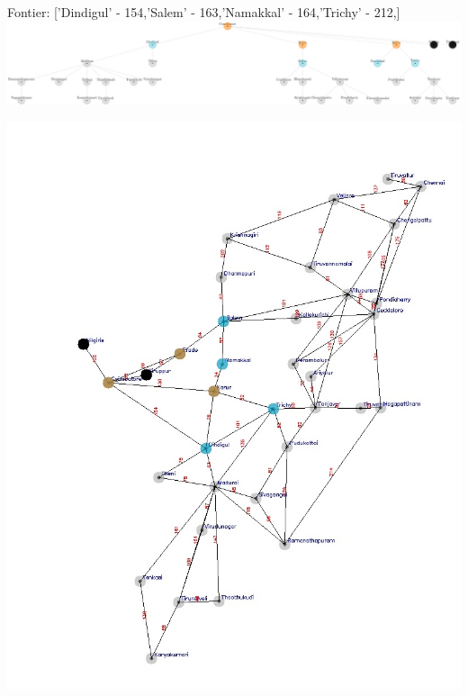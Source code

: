 \documentclass[xcolor=table]{beamer}
\begin{document}
\begin{frame}
  { \tiny Fontier: ['Dindigul' - 154,'Salem' - 163,'Namakkal' - 164,'Trichy' - 212,] }
  \includegraphics[width=1\textwidth]{../UCSNodes/9-1.png}
  \begin{center}
    \includegraphics[height=0.6\textheight]{../UCSoutput/tamilUCS7.jpg}
  \end{center}
\end{frame}
\end{document}
